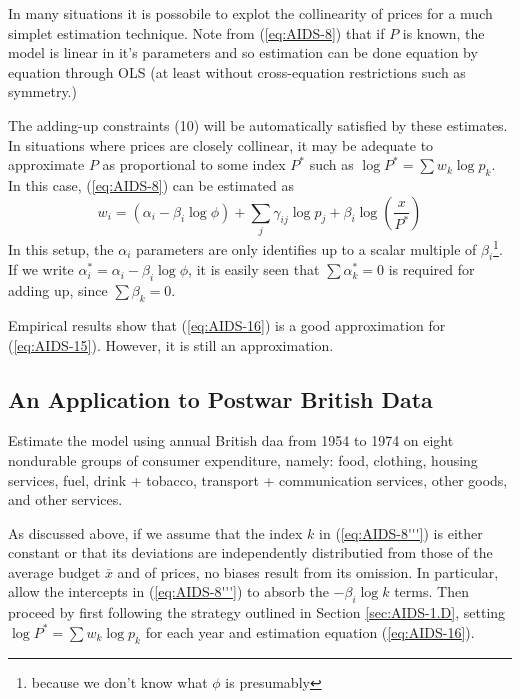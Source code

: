 In many situations it is possobile to explot the collinearity of prices for a much simplet estimation technique. Note from (\ref{eq:AIDS-8}) that if $P$ is known, the model is linear in it's parameters and so estimation can be done equation by equation through OLS (at least without cross-equation restrictions such as symmetry.)

The adding-up constraints (10) will be automatically satisfied by these estimates. In situations where prices are closely collinear, it may be adequate to approximate $P$ as proportional to some index $P^*$ such as $\log P^* = \sum w_k \log p_k$. In this case, (\ref{eq:AIDS-8}) can be estimated as 
\begin{equation}
	\label{eq:AIDS-16}
	w_i = (\alpha_i - \beta_i \log \phi) + \sum_j \gamma_{ij} \log p_j + \beta_i \log\left(\frac{x}{P^*}\right)
\end{equation}
In this setup, the $\alpha_i$ parameters are only identifies up to a scalar multiple of $\beta_i$\footnote{because we don't know what $\phi$ is presumably}. If we write $\alpha_i^* = \alpha_i - \beta_i \log \phi$, it is easily seen that $\sum \alpha_k^* = 0$ is required for adding up, since $\sum \beta_k = 0$. 

Empirical results show that (\ref{eq:AIDS-16}) is a good approximation for (\ref{eq:AIDS-15}). However, it is still an approximation.

\subsection{An Application to Postwar British Data}

Estimate the model using annual British daa from 1954 to 1974 on eight nondurable groups of consumer expenditure, namely: food, clothing, housing services, fuel, drink + tobacco, transport + communication services, other goods, and other services.

As discussed above, if we assume that the index $k$ in (\ref{eq:AIDS-8'''}) is either constant or that its deviations are independently distributied from those of the average budget $\bar{x}$ and of prices, no biases result from its omission. In particular, allow the intercepts in (\ref{eq:AIDS-8'''}) to absorb the $-\beta_i \log k$ terms. Then proceed by first following the strategy outlined in Section \ref{sec:AIDS-1.D}, setting $\log P^* = \sum w_k \log p_k$ for each year and estimation equation (\ref{eq:AIDS-16}).








